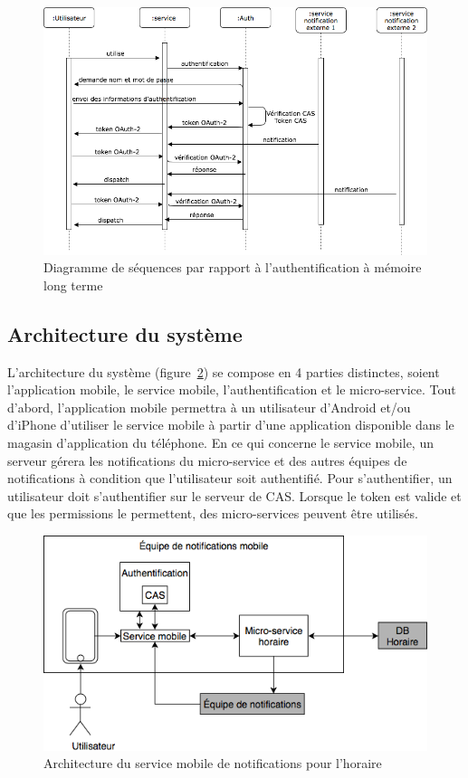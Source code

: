 	\begin{figure}[hp]
		\centering
		\includegraphics[width=\textwidth]{Figures/Sequences}
		\caption{Diagramme de séquences par rapport à l'authentification à mémoire long terme}
		\label{fig.sequences}
	\end{figure}
	
	\subsection{Architecture du système}
	L’architecture du système (figure~\ref{fig.architecture}) se compose en 4 parties distinctes, soient l’application mobile, le service mobile, l’authentification et le micro-service. Tout d’abord, l’application mobile permettra à un utilisateur d’Android et/ou d’iPhone d’utiliser le service mobile à partir d’une application disponible dans le magasin d’application du téléphone. En ce qui concerne le service mobile, un serveur gérera les notifications du micro-service et des autres équipes de notifications à condition que l’utilisateur soit authentifié. Pour s'authentifier, un utilisateur doit s’authentifier sur le serveur de CAS. Lorsque le token est valide et que les permissions le permettent, des micro-services peuvent être utilisés.
	
	\begin{figure}[hp]
		\centering
		\includegraphics[width=\textwidth]{Figures/Architecture}
		\caption{Architecture du service mobile de notifications pour l’horaire}
		\label{fig.architecture}
	\end{figure}


